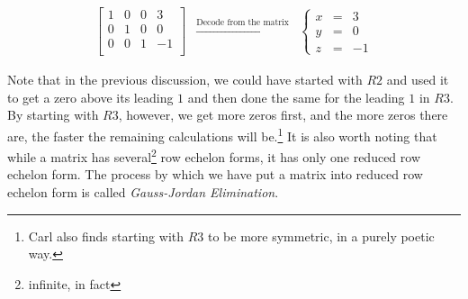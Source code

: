 \documentclass{ximera}
\begin{document}
\[ \begin{array}{ccc}

\left[ \begin{array}{rrr|r} 
1 & 0 & 0 & 3 \\ 
0 & 1 & 0 & 0 \\ 
0 & 0 &1 & -1 \\ 
\end{array} \right]  
 
& 
\xrightarrow{\text{Decode from the matrix}} 
& 
\left\{ \begin{array}{rcr} 
x & = & 3 \\ 
y & = & 0 \\ 
z & = & -1 \end{array} \right.

\end{array}\]

Note that in the previous discussion, we could have started with $R2$ and used it to get a zero above its leading $1$ and then done the same for the leading $1$ in $R3$.  By starting with $R3$, however, we get more zeros first, and the more zeros there are, the faster the remaining calculations will be.\footnote{Carl also finds starting with $R3$ to be more symmetric, in a purely poetic way.}  It is also worth noting that while a matrix has several\footnote{infinite, in fact} row echelon forms, it has only one reduced row echelon form.  The process by which we have put a matrix into reduced row echelon form is called   \textit{Gauss-Jordan Elimination}.
\end{document}
